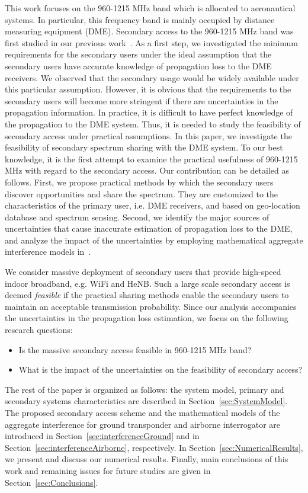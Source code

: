 \documentclass[12pt,submission,journal,onecolumn]{IEEEtran}
\begin{document}
This work focuses on the 960-1215 MHz band which is allocated to aeronautical systems. In particular, this frequency band is mainly occupied by distance measuring equipment (DME). Secondary access to the 960-1215 MHz band was first studied in our previous work~\cite{5936226}. As a first step, we investigated the minimum requirements for the secondary users under the ideal assumption that the secondary users have accurate knowledge of propagation loss to the DME receivers. We observed that the secondary usage would be widely available under this particular assumption. However, it is obvious that the requirements to the secondary users will become more stringent if there are uncertainties in the propagation information. In practice, it is difficult to have perfect knowledge of the propagation to the DME system. Thus, it is needed to study the feasibility of secondary access under practical assumptions.
In this paper, we investigate the feasibility of secondary spectrum sharing with the DME system. To our best knowledge, it is the first attempt to examine the practical usefulness of 960-1215 MHz with regard to the secondary access. Our contribution can be detailed as follows. First, we propose practical methods by which the secondary users discover opportunities and share the spectrum. They are customized to the characteristics of the primary user, i.e. DME receivers, and based on geo-location database and spectrum sensing. Second, we identify the major sources of uncertainties that cause inaccurate estimation of propagation loss to the DME, and analyze the impact of the uncertainties by employing mathematical aggregate interference models in~\cite{gs0801,5701700}.

We consider massive deployment of secondary users that provide high-speed indoor broadband, e.g. WiFi and HeNB. Such a large scale secondary access is deemed \emph{feasible} if the practical sharing methods enable the secondary users to maintain an acceptable transmission probability. Since our analysis accompanies the uncertainties in the propagation loss estimation, we focus on the following research questions:

\begin{itemize}
\item Is the massive secondary access feasible in 960-1215 MHz band?\item What is the impact of the uncertainties on the feasibility of secondary access?
\end{itemize}

The rest of the paper is organized as follows: the system model, primary and secondary systems characteristics are described in Section~\ref{sec:SystemModel}. The proposed secondary access scheme and the mathematical models of the aggregate interference for ground transponder and airborne interrogator are introduced in Section~\ref{sec:interferenceGround} and in Section~\ref{sec:interferenceAirborne}, respectively. In Section~\ref{sec:NumericalResults}, we present and discuss our numerical results. Finally, main conclusions of this work and remaining issues for future studies are given in Section~\ref{sec:Conclusions}.
\end{document}
